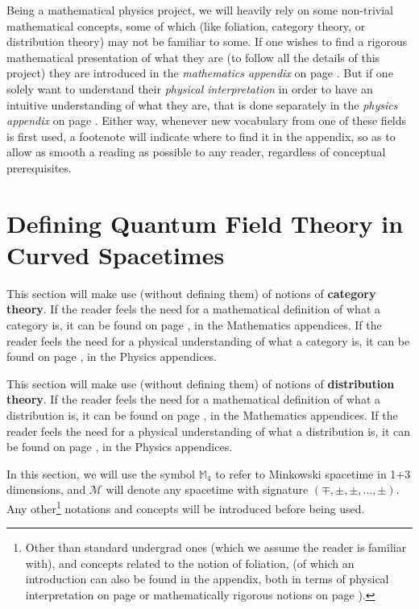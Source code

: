 \documentclass[a4paper,11pt]{article}
\numberwithin{equation}{section}
\theoremstyle{definition}
\begin{document}
Being a mathematical physics project, we will heavily rely on some non-trivial mathematical concepts, some of which (like foliation, category theory, or distribution theory) may not be familiar to some. If one wishes to find a rigorous mathematical presentation of what they are (to follow all the details of this project) they are introduced in the \textit{mathematics appendix} on page \pageref{AnMaCat}. But if one solely want to understand their \textit{physical interpretation} in order to have an intuitive understanding of what they are, that is done separately in the \textit{physics appendix} on page \pageref{AnPhCat}. Either way, whenever new vocabulary from one of these fields is first used, a footenote will indicate where to find it in the appendix, so as to allow as smooth a reading as possible to any reader, regardless of conceptual prerequisites.


\newpage
\tableofcontents
\newpage
\section{Defining Quantum Field Theory in Curved Spacetimes}
This section will make use (without defining them) of notions of \textbf{category theory}. If the reader feels the need for a mathematical definition of what a category is, it can be found on page \pageref{AnMaCat}, in the Mathematics appendices. If the reader feels the need for a physical understanding of what a category is, it can be found on page \pageref{AnPhCat}, in the Physics appendices.

This section will make use (without defining them) of notions of \textbf{distribution theory}. If the reader feels the need for a mathematical definition of what a distribution is, it can be found on page \pageref{DistribMath}, in the Mathematics appendices. If the reader feels the need for a physical understanding of what a distribution is, it can be found on page \pageref{DistribPhy}, in the Physics appendices.

In this section, we will use the symbol $\mathbb{M}_4$ to refer to Minkowski spacetime in 1+3 dimensions, and $\mathcal{M}$ will denote any spacetime with signature $(\mp, \pm,\pm, ..., \pm)$. Any other\footnote{Other than standard undergrad ones (which we assume the reader is familiar with), and concepts related to the notion of foliation, (of which an introduction can also be found in the appendix, both in terms of physical interpretation on page \pageref{PhyFoli} or mathematically rigorous notions on page \pageref{MatFoli}).} notations and concepts will be introduced before being used.
\end{document}
